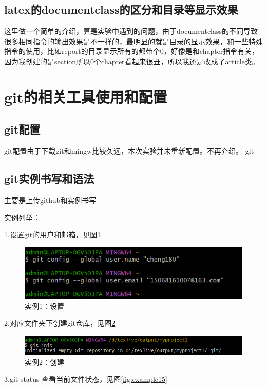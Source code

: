 \documentclass{article}
\begin{document}
	\newpage
	
	\subsection{latex的documentclass的区分和目录等显示效果}
	这里做一个简单的介绍，算是实验中遇到的问题，由于documentclass的不同导致很多相同指令的输出效果是不一样的，最明显的就是目录的显示效果，和一些特殊指令的使用，比如report的目录显示所有的都带个0，好像是和chapter指令有关，因为我创建的是section所以0个chapter看起来很丑，所以我还是改成了article类。
	\newpage
	\section{git的相关工具使用和配置}
	\subsection{git配置}
	git配置由于下载git和mingw比较久远，本次实验并未重新配置。不再介绍。
	git
	\subsection{git实例书写和语法}
	主要是上传github和实例书写
	
	实例列举：
	
	1.设置git的用户和邮箱，见图\ref{fig:example13}
		\begin{figure}[h]  
		\centering
		\includegraphics[width=1\textwidth]{1.png}
		\caption{实例1：设置}
		\label{fig:example13}
	\end{figure}
	
	2.对应文件夹下创建git仓库，见图\ref{fig:example14}
	
		\begin{figure}[h]  
		\centering
		\includegraphics[width=1\textwidth]{2.png}
		\caption{实例2：创建}
		\label{fig:example14}
	\end{figure}
	
	3.git status 查看当前文件状态，见图\ref{fig:example15}
	
\end{document}
